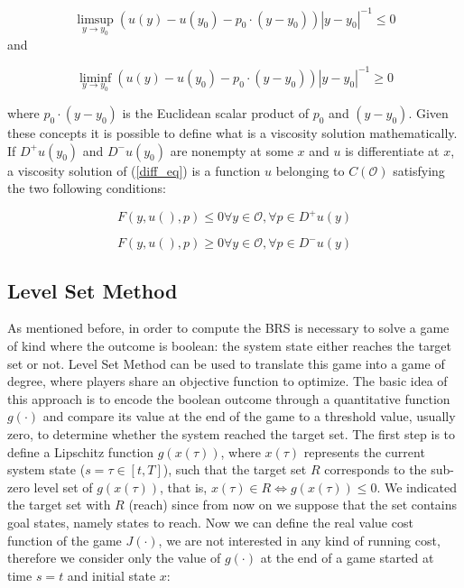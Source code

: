 \begin{equation}
	\limsup_{y \to y_0} (u(y)-u(y_0)-p_0 \cdot (y-y_0)) |y-y_0|^{-1} \leq 0
\end{equation}
and

\begin{equation}
	\liminf_{y \to y_0} (u(y)-u(y_0)-p_0 \cdot (y-y_0)) |y-y_0|^{-1} \geq 0
\end{equation}

where $p_0 \cdot (y-y_0)$ is the Euclidean scalar product of $p_0$ and $(y-y_0)$. 
Given these concepts it is possible to define what is a viscosity solution mathematically. 
If $D^+u(y_0)$ and $D^-u(y_0)$ are nonempty at some $x$ and $u$ is differentiate at $x$, a viscosity solution of (\ref{diff_eq}) is a function $u$ belonging to $C(\mathcal{O})$ satisfying the two following conditions:

\begin{equation}
	F(y,u(),p)\leq 0 \forall y \in \mathcal{O}, \forall p \in D^+ u(y)
\end{equation}

\begin{equation}
	F(y,u(),p)\geq 0 \forall y \in \mathcal{O}, \forall p \in D^- u(y)
\end{equation}


\subsection{Level Set Method}
As mentioned before, in order to compute the BRS is necessary to solve a game of kind where the outcome is boolean: the system state either reaches the target set or not. Level Set Method can be used to translate this game into a game of degree, where players share an objective function to optimize. The basic idea of this approach is to encode the boolean outcome through a quantitative function $g(\cdot)$ and compare its value at the end of the game to a threshold value, usually zero, to determine whether the system reached the target set.
The first step is to define a Lipschitz function $g(x(\tau))$, where $x(\tau)$ represents the current system state ($s=\tau\in[t, T]$), such that the target set $R$ corresponds to the sub-zero level set of $g(x(\tau))$, that is, $x(\tau)\in R \Leftrightarrow g(x(\tau)) \leq 0$. We indicated the target set with $R$ (reach) since from now on we suppose that the set contains goal states, namely states to reach. Now we can define the real value cost function of the game $J(\cdot)$, we are not interested in any kind of running cost, therefore we consider only the value of $g(\cdot)$ at the end of a game started at time $s=t$ and initial state $x$:

